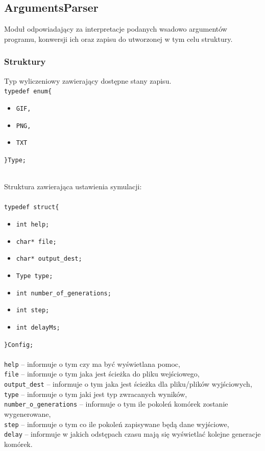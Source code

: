 \documentclass{article}
\begin{document}
\subsection{ArgumentsParser}
Moduł odpowiadający za interpretacje podanych wsadowo argumentów programu, konwersji ich oraz zapisu do utworzonej w tym celu struktury.

\subsubsection{Struktury}
\begin{samepage}
Typ wyliczeniowy zawierający dostępne stany zapisu. \\

\noindent\texttt{typedef enum\{}
\begin{itemize}[label={}, noitemsep, topsep=0pt]
	\item \texttt{GIF,}
	\item \texttt{PNG,}
	\item \texttt{TXT}
\end{itemize}
\texttt{\}Type;}\\\\
\end{samepage}


\noindent Struktura zawierająca ustawienia symulacji: \\\\

\noindent\texttt{typedef struct\{}
\begin{itemize}[label={}, noitemsep, topsep=0pt]
	\item \texttt{int help;}
	\item \texttt{char* file;}
	\item \texttt{char* output\_dest;}
	\item \texttt{Type type;}
	\item \texttt{int number\_of\_generations;}
	\item \texttt{int step;}
	\item \texttt{int delayMs;}
\end{itemize}
\texttt{\}Config;}
\\\\
\texttt{help} -- informuje o tym czy ma być wyświetlana pomoc,\\
\texttt{file} -- informuje o tym jaka jest ścieżka do pliku wejściowego,\\
\texttt{output\_dest} --  informuje o tym jaka jest ścieżka dla pliku/plików wyjściowych,\\
\texttt{type} -- informuje o tym jaki jest typ zwracanych wyników,\\
\texttt{number\_o\_generations} -- informuje o tym ile pokoleń komórek zostanie wygenerowane,\\
\texttt{step} -- informuje o tym co ile pokoleń zapisywane będą dane wyjściowe,\\
\texttt{delay} -- informuje w jakich odstępach czasu mają się wyświetlać kolejne generacje komórek.\\
\end{document}
